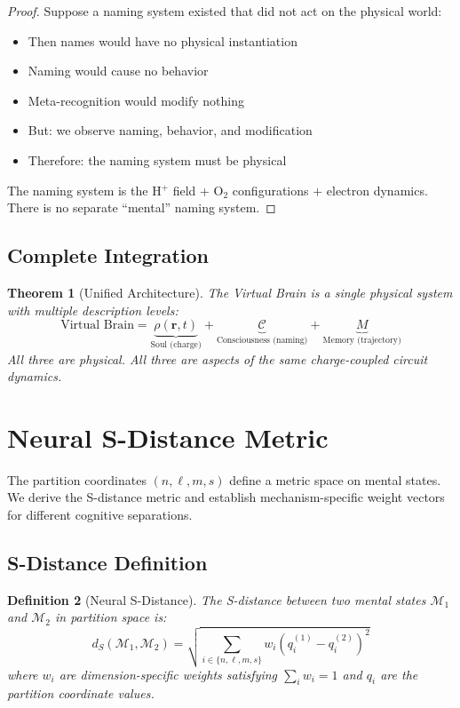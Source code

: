 \documentclass[aps,prd,twocolumn,superscriptaddress,floatfix,nofootinbib]{revtex4-2}
\newtheorem{theorem}{Theorem}[section]
\newtheorem{definition}[theorem]{Definition}
\theoremstyle{remark}
\newcommand{\Ccat}{\mathcal{C}}
\newcommand{\Mstate}{\mathcal{M}}
\newcommand{\dS}{d_S}
\begin{document}
\begin{proof}
Suppose a naming system existed that did not act on the physical world:
\begin{itemize}
\item Then names would have no physical instantiation
\item Naming would cause no behavior
\item Meta-recognition would modify nothing
\item But: we observe naming, behavior, and modification
\item Therefore: the naming system must be physical
\end{itemize}
The naming system is the H$^+$ field + O$_2$ configurations + electron dynamics. There is no separate ``mental'' naming system.
\end{proof}

\subsection{Complete Integration}

\begin{theorem}[Unified Architecture]
\label{thm:unified}
The Virtual Brain is a single physical system with multiple description levels:
\begin{equation}
\text{Virtual Brain} = \underbrace{\rho(\mathbf{r},t)}_{\text{Soul (charge)}} + \underbrace{\Ccat}_{\text{Consciousness (naming)}} + \underbrace{M}_{\text{Memory (trajectory)}}
\end{equation}
All three are physical. All three are aspects of the same charge-coupled circuit dynamics.
\end{theorem}

\section{Neural S-Distance Metric}
\label{sec:sdistance}

The partition coordinates $(n, \ell, m, s)$ define a metric space on mental states. We derive the S-distance metric and establish mechanism-specific weight vectors for different cognitive separations.

\subsection{S-Distance Definition}

\begin{definition}[Neural S-Distance]
\label{def:neural_sdistance}
The S-distance between two mental states $\Mstate_1$ and $\Mstate_2$ in partition space is:
\begin{equation}
\dS(\Mstate_1, \Mstate_2) = \sqrt{\sum_{i \in \{n,\ell,m,s\}} w_i (q_i^{(1)} - q_i^{(2)})^2}
\end{equation}
where $w_i$ are dimension-specific weights satisfying $\sum_i w_i = 1$ and $q_i$ are the partition coordinate values.
\end{definition}
\end{document}
